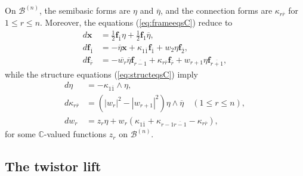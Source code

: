 \documentclass[11pt]{article}
\theoremstyle{definition}
\newcommand{\C}{\mathbb{C}}
\numberwithin{equation}{section}
\begin{document}
On $\mathcal{B}^{(n)}$, the semibasic forms are $\eta$ and $\overline{\eta}$, and the connection forms are $\kappa_{r\overline{r}}$ for $1 \leq r \leq n$. Moreover, the equations (\ref{eq:frameeqsC}) reduce to
\begin{equation}\label{eq:dxfcomp}
	\begin{aligned}
		d \mathbf{x}                & = \tfrac{1}{2} \mathbf{f}_{\overline{1}} \eta + \tfrac{1}{2} \mathbf{f}_1 \overline{\eta},                                                                     \\
		d \mathbf{f}_{\overline{1}} & = - \overline{\eta} \mathbf{x} + \kappa_{1 \overline{1}} \mathbf{f}_{\overline{1}} + w_2 \eta \mathbf{f}_{\overline{2}},                                       \\
		d \mathbf{f}_{\overline{r}} & = - \overline{w_r} \overline{\eta} \mathbf{f}_{\overline{r-1}} + \kappa_{r \overline{r}} \mathbf{f}_{\overline{r}} + w_{r+1} \eta \mathbf{f}_{\overline{r+1}}, 
	\end{aligned}
\end{equation}
while the structure equations (\ref{eq:structeqsC}) imply
\begin{equation}\label{eq:structeqsSig}
	\begin{aligned}
		d \eta                    & = - \kappa_{1 \overline{1}} \wedge \eta,                                                                                                  \\
		d \kappa_{r \overline{r}} & = \left( \left\lvert w_r \right\rvert^2 - \left\lvert w_{r+1} \right\rvert^2 \right) \eta \wedge \overline{\eta} \quad (1 \leq r \leq n), \\
		d w_r                     & = z_r \eta + w_r(\kappa_{1 \overline{1}} + \kappa_{r-1 \overline{r-1}} - \kappa_{r \overline{r}}),                                        
	\end{aligned}
\end{equation}
for some $\C$-valued functions $z_r$ on $\mathcal{B}^{(n)}.$

\subsection{The twistor lift}\label{ssect:twistorlift}
\end{document}
